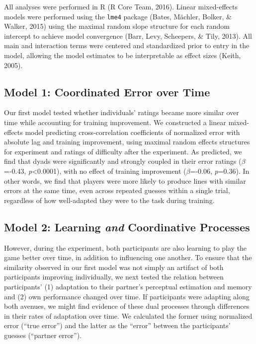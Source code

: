 \documentclass[10pt, letterpaper]{article}
\begin{document}
All analyses were performed in R (R Core Team, 2016). Linear
mixed-effects models were performed using the \texttt{lme4} package
(Bates, Mächler, Bolker, \& Walker, 2015) using the maximal random slope
structure for each random intercept to achieve model convergence (Barr,
Levy, Scheepers, \& Tily, 2013). All main and interaction terms were
centered and standardized prior to entry in the model, allowing the
model estimates to be interpretable as effect sizes (Keith, 2005).

\subsection{Model 1: Coordinated Error over
Time}\label{model-1-coordinated-error-over-time}

Our first model tested whether individuals' ratings became more similar
over time while accounting for training improvement. We constructed a
linear mixed-effects model predicting cross-correlation coefficients of
normalized error with absolute lag and training improvement, using
maximal random effects structures for experiment and ratings of
difficulty after the experiment. As predicted, we find that dyads were
significantly and strongly coupled in their error ratings
(\emph{\(\beta\)}=-0.43, \emph{p}\textless{}0.0001), with no effect of
training improvement (\emph{\(\beta\)}=-0.06, \emph{p}=0.36). In other
words, we find that players were more likely to produce lines with
similar errors at the same time, even across repeated guesses within a
single trial, regardless of how well-adapted they were to the task
during training.

\subsection{\texorpdfstring{Model 2: Learning \emph{and} Coordinative
Processes}{Model 2: Learning and Coordinative Processes}}\label{model-2-learning-and-coordinative-processes}

However, during the experiment, both participants are also learning to
play the game better over time, in addition to influencing one another.
To ensure that the similarity observed in our first model was not simply
an artifact of both participants improving individually, we next tested
the relation between participants' (1) adaptation to their partner's
perceptual estimation and memory and (2) own performance changed over
time. If participants were adapting along both avenues, we might find
evidence of these dual processes through differences in their rates of
adaptation over time. We calculated the former using normalized error
(``true error'') and the latter as the ``error'' between the
participants' guesses (``partner error'').
\end{document}

